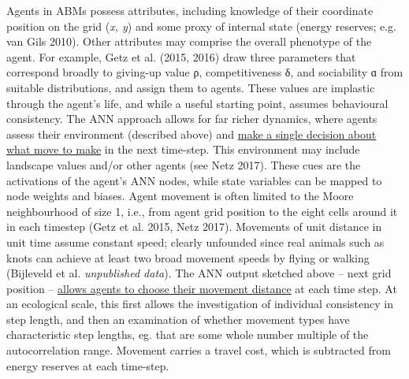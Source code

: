 \documentclass[]{scrartcl}
\begin{document}
\begin{linenumbers}
Agents in ABMs possess attributes, including knowledge of their
coordinate position on the grid (\emph{x, y}) and some proxy of internal
state (energy reserves; e.g.
\protect\hypertarget{__UnoMark__4321_580056431}{}{}van Gils 2010). Other
attributes may comprise the overall phenotype of the agent. For example,
\protect\hypertarget{__UnoMark__53995_4107183634}{}{\protect\hypertarget{ZOTERO_BREF_hoP608dQ9D4U}{}{\protect\hypertarget{__UnoMark__2645_580056431}{}{\protect\hypertarget{__UnoMark__39694_623588325}{}{}}}}Getz
et al. (2015, 2016) draw three parameters that correspond broadly to
giving-up value ρ, competitiveness δ, and sociability ɑ from suitable
distributions, and assign them to agents. These values are implastic
through the agent's life, and while a useful starting point, assumes
behavioural consistency. The ANN approach allows for far richer
dynamics, where agents assess their environment (described above) and
\underline{make a single decision about what move to make} in the next
time-step. This environment may include landscape values and/or other
agents (see \protect\hypertarget{__UnoMark__4328_580056431}{}{}Netz
2017). These cues are the activations of the agent's ANN nodes, while
state variables can be mapped to node weights and biases. Agent movement
is often limited to the Moore neighbourhood of size 1, i.e., from agent
grid position to the eight cells around it in each timestep
(\protect\hypertarget{__UnoMark__4335_580056431}{}{}Getz et al. 2015,
Netz 2017). Movements of unit distance in unit time assume constant
speed; clearly unfounded since real animals such as knots can achieve at
least two broad movement speeds by flying or walking (Bijleveld et al.
\emph{unpublished data}). The ANN output sketched above -- next grid
position -- \underline{allows agents to choose their movement distance} at
each time step. At an ecological scale, this first allows the
investigation of individual consistency in step length, and then an
examination of whether movement types have characteristic step lengths,
eg. that are some whole number multiple of the autocorrelation range.
Movement carries a travel cost, which is subtracted from energy reserves
at each time-step.


\end{linenumbers}
\end{document}
